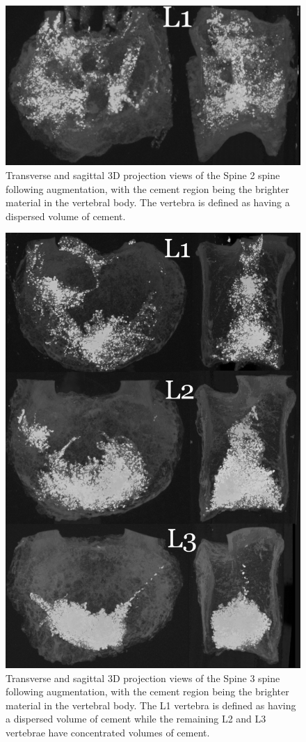\begin{figure}[h!]
  \centering
 
\includegraphics[width=.65\textwidth]{Chapters/Chapter_HT_images/G19-11_projections}
	\caption{Transverse and sagittal 3D projection views of the Spine 2 spine
following augmentation, with the cement region being the brighter material in
the vertebral body. The vertebra is defined as having a dispersed volume of
cement.}
  \label{fig:Spine 2_projection}
\end{figure}

\begin{figure}[h!]
  \centering
 
\includegraphics[width=.65\textwidth]{Chapters/Chapter_HT_images/G21-11_projections}
	\caption{Transverse and sagittal 3D projection views of the Spine 3 spine
following augmentation, with the cement region being the brighter material in
the vertebral body. The L1 vertebra is defined as having a dispersed volume of
cement while the remaining L2 and L3 vertebrae have concentrated volumes of
cement.}
  \label{fig:Spine 3_projection}
\end{figure}

